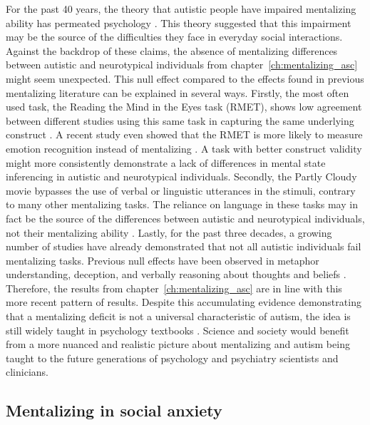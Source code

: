 For the past 40 years, the theory that autistic people have impaired mentalizing ability has permeated psychology \citep{baron-cohen1985,gernsbacher2019}. This theory suggested that this impairment may be the source of the difficulties they face in everyday social interactions. Against the backdrop of these claims, the absence of mentalizing differences between autistic and neurotypical individuals from chapter~\ref{ch:mentalizing_asc} might seem unexpected. This null effect compared to the effects found in previous mentalizing literature can be explained in several ways. Firstly, the most often used task, the Reading the Mind in the Eyes task (RMET), shows low agreement between different studies using this same task in capturing the same underlying construct \citep{higgins2024}. A recent study even showed that the RMET is more likely to measure emotion recognition instead of mentalizing \citep{oakley2016}. A task with better construct validity might more consistently demonstrate a lack of differences in mental state inferencing in autistic and neurotypical individuals. Secondly, the Partly Cloudy movie bypasses the use of verbal or linguistic utterances in the stimuli, contrary to many other mentalizing tasks. The reliance on language in these tasks may in fact be the source of the differences between autistic and neurotypical individuals, not their mentalizing ability \citep{shaked2006,capage2001,gernsbacher2005,scheeren2013}. Lastly, for the past three decades, a growing number of studies have already demonstrated that not all autistic individuals fail mentalizing tasks. Previous null effects have been observed in metaphor understanding, deception, and verbally reasoning about thoughts and beliefs \citep{happe1993, bowler1992, pantelis2017, vantiel2021, ponnet2005, scheeren2013}. Therefore, the results from chapter~\ref{ch:mentalizing_asc} are in line with this more recent pattern of results. Despite this accumulating evidence demonstrating that a mentalizing deficit is not a universal characteristic of autism, the idea is still widely taught in psychology textbooks \citep{coon2021,kellogg2016,sigelman2018,myers2014}. Science and society would benefit from a more nuanced and realistic picture about mentalizing and autism being taught to the future generations of psychology and psychiatry scientists and clinicians.

\subsection*{Mentalizing in social anxiety}

